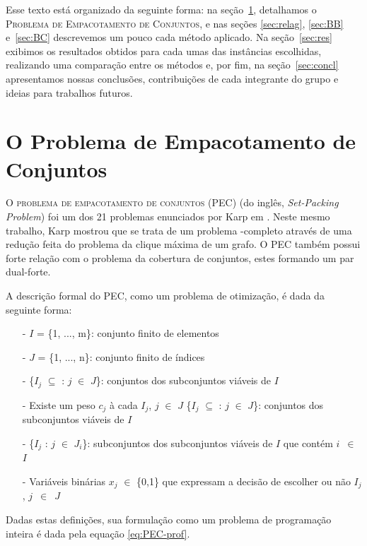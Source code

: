 \documentclass{article}
\begin{document}
	Esse texto está organizado da seguinte forma: na seção~\ref{sec:prob}, detalhamos o \textsc{Problema de Empacotamento de Conjuntos}, e nas seções \ref{sec:relag}, \ref{sec:BB} e~\ref{sec:BC} descrevemos um pouco cada método aplicado. Na seção~\ref{sec:res} exibimos os resultados obtidos para cada umas das instâncias escolhidas, realizando uma comparação entre os métodos e, por fim, na seção~\ref{sec:concl} apresentamos nossas conclusões, contribuições de cada integrante do grupo e ideias para trabalhos futuros.
	
	\section{O Problema de Empacotamento de Conjuntos}\label{sec:prob}
	O \textsc{problema de empacotamento de conjuntos} (PEC) (do inglês, \emph{Set-Packing Problem}) foi um dos 21 problemas enunciados por Karp em \cite{Karp}. Neste mesmo trabalho, Karp mostrou que se trata de um problema \NP-completo através de uma redução feita do problema da clique máxima de um grafo. O PEC também possui forte relação com o problema da cobertura de conjuntos, estes formando um par dual-forte.
	
	A descrição formal do PEC, como um problema de otimização, é dada da seguinte forma:

	\begin{itemize}
	    \item[-] $I$ = \{1, ..., m\}: conjunto finito de elementos
	    
	    \item[-] $J$ = \{1, ..., n\}: conjunto finito de índices
	    
	    \item[-] \{$I_j$ $\subseteq$ : $j$ $\in$ $J$\}: conjuntos dos subconjuntos viáveis de $I$
	    
	    \item[-] Existe um peso $c_j$ à cada $I_j$, $j$ $\in$ $J$
	    \{$I_j$ $\subseteq$ : $j$ $\in$ $J$\}: conjuntos dos subconjuntos viáveis de $I$
	    
	    \item[-] \{$I_j$ : $j$ $\in$ $J_i$\}: subconjuntos dos subconjuntos viáveis de $I$ que contém $i$~$\in$~$I$
	    \item[-] Variáveis binárias $x_j$ $\in$ \{0,1\} que expressam a decisão de escolher ou não $I_j$, $j$~$\in$~$J$
	\end{itemize}
	
	
	Dadas estas definições, sua formulação como um problema de programação inteira é dada pela equação \ref{eq:PEC-prof}.
	
\end{document}
